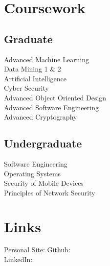 \documentclass[]{johns_resume_style}
\begin{document}
\begin{minipage}[t]{0.31\textwidth}
\sectionsep


\section{Coursework}
\subsection{Graduate}
Advanced Machine Learning \\
Data Mining 1 \& 2 \\
Artificial Intelligence \\
Cyber Security \\
Advanced Object Oriented Design \\
Advanced Software Engineering \\
Advanced Cryptography \\
\sectionsep

\subsection{Undergraduate}
Software Engineering \\
Operating Systems \\
Security of Mobile Devices \\
Principles of Network Security \\
\sectionsep



\section{Links} 
Personal Site: \href{https://JohnathanSaunders.com}{}
Github: \href{https://github.com/sirsaunders}{} \\
LinkedIn:  \href{https://www.linkedin.com/in/johnathan-saunders}{} \\

\sectionsep
%
%

\end{minipage} 
\hfill
\end{document}
